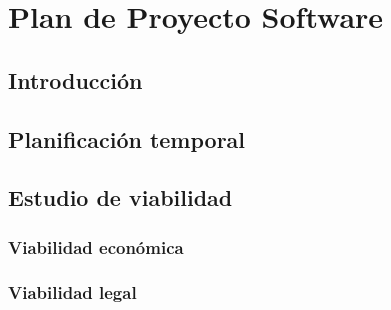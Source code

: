 \chapter{Plan de Proyecto Software}
\label{cha:Plan de Proyecto Software}

\section{Introducción}

\section{Planificación temporal}

\section{Estudio de viabilidad}

\subsection{Viabilidad económica}

\subsection{Viabilidad legal}
